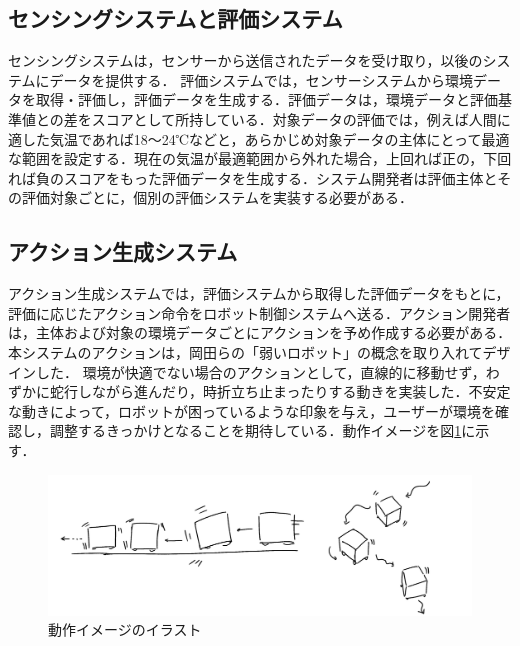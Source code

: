\documentclass[paper=a4paper,jafontsize=9pt,head_space=15mm,gutter=20mm,
twocolumn,number_of_lines=49, line_length=26zw]{myuarticle}
\begin{document}
\subsection{センシングシステムと評価システム}
センシングシステムは，センサーから送信されたデータを受け取り，以後のシステムにデータを提供する．
評価システムでは，センサーシステムから環境データを取得・評価し，評価データを生成する．評価データは，環境データと評価基準値との差をスコアとして所持している．対象データの評価では，例えば人間に適した気温であれば18～24℃などと，あらかじめ対象データの主体にとって最適な範囲を設定する．現在の気温が最適範囲から外れた場合，上回れば正の，下回れば負のスコアをもった評価データを生成する．システム開発者は評価主体とその評価対象ごとに，個別の評価システムを実装する必要がある．

\subsection{アクション生成システム}
アクション生成システムでは，評価システムから取得した評価データをもとに，評価に応じたアクション命令をロボット制御システムへ送る．アクション開発者は，主体および対象の環境データごとにアクションを予め作成する必要がある．本システムのアクションは，岡田ら\cite{岡田-2017-弱いロボ}の「弱いロボット」の概念を取り入れてデザインした．
環境が快適でない場合のアクションとして，直線的に移動せず，わずかに蛇行しながら進んだり，時折立ち止まったりする動きを実装した．不安定な動きによって，ロボットが困っているような印象を与え，ユーザーが環境を確認し，調整するきっかけとなることを期待している．動作イメージを図\ref{fig:action-image}に示す．

\begin{figure}[h]
  \centering
  \includegraphics[keepaspectratio, width=1.0\columnwidth]{resources/action-image.png}
  \caption[short]{動作イメージのイラスト}
  \label{fig:action-image}
\end{figure}
\end{document}
